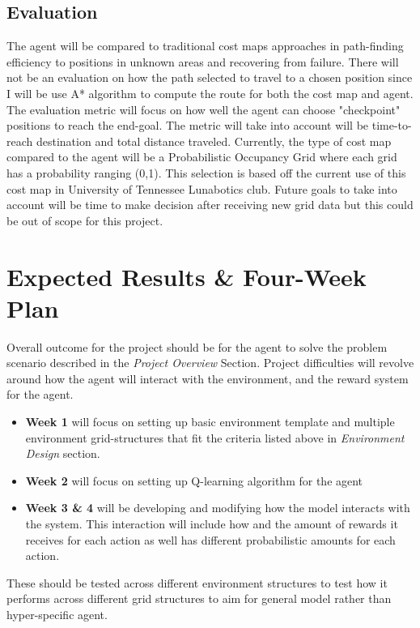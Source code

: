 \documentclass[12pt]{article}
\begin{document}
\subsection*{Evaluation}
\noindent The agent will be compared to traditional cost maps approaches in path-finding efficiency to positions in unknown areas and recovering from failure.
There will not be an evaluation on how the path selected to travel to a chosen position since I will be use A* algorithm to compute the route for both the cost map and agent.
The evaluation metric will focus on how well the agent can choose "checkpoint" positions to reach the end-goal.
The metric will take into account will be time-to-reach destination and total distance traveled.
Currently, the type of cost map compared to the agent will be a Probabilistic Occupancy Grid where each grid has a probability ranging (0,1).
This selection is based off the current use of this cost map in University of Tennessee Lunabotics club. 
Future goals to take into account will be time to make decision after receiving new grid data but this could be out of scope for this project. 

\section*{Expected Results \& Four-Week Plan}
Overall outcome for the project should be for the agent to solve the problem scenario described in the \textit{Project Overview} Section.
Project difficulties will revolve around how the agent will interact with the environment, and the reward system for the agent.
\begin{itemize}
   \item \textbf{Week 1} will focus on setting up basic environment template and multiple environment grid-structures that fit the criteria listed above in \textit{Environment Design} section.
    \item \textbf{Week 2} will focus on setting up Q-learning algorithm for the agent
    \item \textbf{Week 3 \& 4} will be developing and modifying how the model interacts with the system. 
    This interaction will include how and the amount of rewards it receives for each action as well has different probabilistic amounts for each action.
\end{itemize}

\noindent These should be tested across different environment structures to test how it performs across different grid structures to aim for general model rather than hyper-specific agent.
\end{document}
